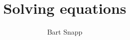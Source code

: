 \documentclass{article}
\author{Bart Snapp}
\title{Solving equations}
\begin{document}
\begin{abstract}
\end{abstract}
\maketitle
\end{document}
